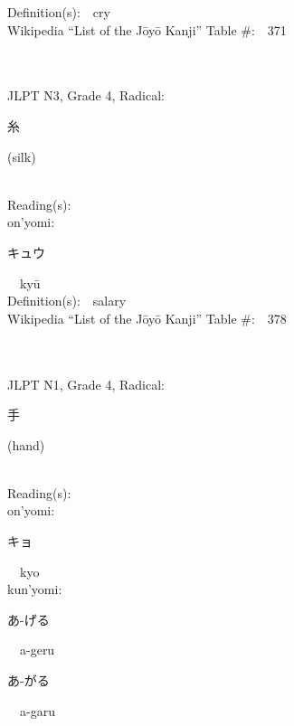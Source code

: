 \begin{multicols}{2}
Definition(s):\ \ cry \\
Wikipedia ``List of the J\=oy\=o Kanji'' Table \#:\ \ 371 \\
\ \ \\
{\fontsize{34pt}{40pt}  }\ \ \\  %
{JLPT N3, Grade 4, Radical:\ \ {\begin{CJK}{UTF8}{min} 糸 \end{CJK}} (silk) } \\
Reading(s):\ \ \\
{\hspace*{1em}}on'yomi:\ \ \\
{\hspace*{2em}}{\begin{CJK}{UTF8}{min} キュウ \end{CJK}}\ \ ky\=u\ \ \\
Definition(s):\ \ salary \\
Wikipedia ``List of the J\=oy\=o Kanji'' Table \#:\ \ 378 \\
\ \ \\
{\fontsize{34pt}{40pt}  }\ \ \\  %
{JLPT N1, Grade 4, Radical:\ \ {\begin{CJK}{UTF8}{min} 手 \end{CJK}} (hand) } \\
Reading(s):\ \ \\
{\hspace*{1em}}on'yomi:\ \ \\
{\hspace*{2em}}{\begin{CJK}{UTF8}{min} キョ \end{CJK}}\ \ kyo\ \ \\
{\hspace*{1em}}kun'yomi:\ \ \\
{\hspace*{2em}}{\begin{CJK}{UTF8}{min} あ-げる \end{CJK}}\ \ a-geru\ \ \\
{\hspace*{2em}}{\begin{CJK}{UTF8}{min} あ-がる \end{CJK}}\ \ a-garu\ \ \\

\end{multicols}
